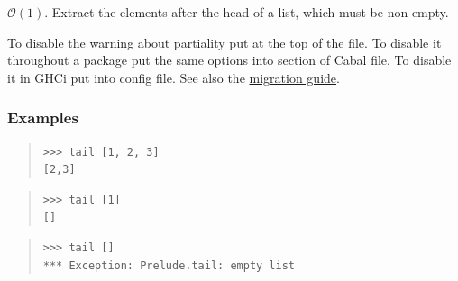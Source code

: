 \begin{haddockdesc}
\item[\begin{tabular}{@{}l}
tail :: HasCallStack => {\char 91}a{\char 93} -> {\char 91}a{\char 93}
\end{tabular}]
{\haddockbegindoc
\(\mathcal{O}(1)\). Extract the elements after the head of a list, which
 must be non-empty.\par
To disable the warning about partiality put 
 at the top of the file. To disable it throughout a package put the same
 options into  section of Cabal file. To disable it in GHCi
 put  into  config file.
 See also the \href{https://github.com/haskell/core-libraries-committee/blob/main/guides/warning-for-head-and-tail.md}{migration guide}.\par
\subsubsection*{\textbf{Examples}}
\begin{quote}
{\haddockverb\begin{verbatim}
>>> tail [1, 2, 3]
[2,3]

\end{verbatim}}
\end{quote}
\begin{quote}
{\haddockverb\begin{verbatim}
>>> tail [1]
[]

\end{verbatim}}
\end{quote}
\begin{quote}
{\haddockverb\begin{verbatim}
>>> tail []
*** Exception: Prelude.tail: empty list

\end{verbatim}}
\end{quote}}
\end{haddockdesc}
